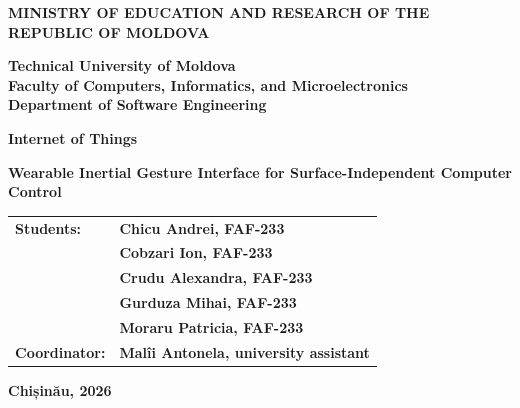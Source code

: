 \newcommand{\ministryname}{MINISTRY OF EDUCATION AND RESEARCH OF THE REPUBLIC OF MOLDOVA}
\newcommand{\universityname}{Technical University of Moldova}
\newcommand{\facultyname}{Faculty of Computers, Informatics, and Microelectronics}
\newcommand{\departmentname}{Department of Software Engineering}
\newcommand{\reporttitle}{Internet of Things}
\newcommand{\reportsubtitle}{Wearable Inertial Gesture Interface for Surface-Independent Computer Control}
\newcommand{\reportyear}{2026}

\begin{titlepage}
    \centering

    {\fontsize{12pt}{12pt}\selectfont\bfseries \ministryname \\[4pt]}

    {\fontsize{14pt}{14pt}\selectfont\bfseries
        \universityname \\[2pt]
        \facultyname \\[2pt]
        \departmentname \\
    }

    \vfill

    {\fontsize{20pt}{22pt}\selectfont\bfseries \reporttitle \par}

    \vspace{10pt}

    {\fontsize{16pt}{18pt}\selectfont\bfseries \reportsubtitle \par}

    \vfill

    \hfill
    \begin{tabular}{ll}
        \textbf{Students:}    & \textbf{Chicu Andrei, FAF-233} \\
                              & \textbf{Cobzari Ion, FAF-233} \\
                              & \textbf{Crudu Alexandra, FAF-233} \\
                              & \textbf{Gurduza Mihai, FAF-233} \\
                              & \textbf{Moraru Patricia, FAF-233} \\[12pt]
        \textbf{Coordinator:} & \textbf{Malîi Antonela, university assistant} \\
    \end{tabular}

    \vfill

    {\fontsize{12pt}{14pt}\selectfont\bfseries Chișinău, \reportyear \par}

\end{titlepage}